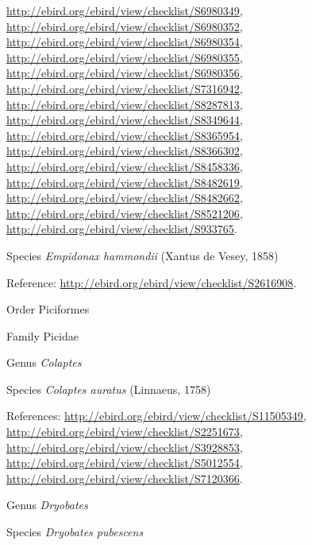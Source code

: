 \documentclass[9pt, article]{memoir}
\begin{document}
\begin{multicols}{2}
\url{http://ebird.org/ebird/view/checklist/S6980349}, 
\url{http://ebird.org/ebird/view/checklist/S6980352}, 
\url{http://ebird.org/ebird/view/checklist/S6980354}, 
\url{http://ebird.org/ebird/view/checklist/S6980355}, 
\url{http://ebird.org/ebird/view/checklist/S6980356}, 
\url{http://ebird.org/ebird/view/checklist/S7316942}, 
\url{http://ebird.org/ebird/view/checklist/S8287813}, 
\url{http://ebird.org/ebird/view/checklist/S8349644}, 
\url{http://ebird.org/ebird/view/checklist/S8365954}, 
\url{http://ebird.org/ebird/view/checklist/S8366302}, 
\url{http://ebird.org/ebird/view/checklist/S8458336}, 
\url{http://ebird.org/ebird/view/checklist/S8482619}, 
\url{http://ebird.org/ebird/view/checklist/S8482662}, 
\url{http://ebird.org/ebird/view/checklist/S8521206}, 
\url{http://ebird.org/ebird/view/checklist/S933765}.

\vspace{6pt}\noindent\hspace{36pt}Species \textit{Empidonax hammondii} (Xantus de Vesey, 1858)


\vspace{6pt}Reference: 
\url{http://ebird.org/ebird/view/checklist/S2616908}.

\vspace{6pt}\noindent\hspace{18pt}Order Piciformes


\vspace{6pt}\noindent\hspace{24pt}Family Picidae


\vspace{6pt}\noindent\hspace{30pt}Genus \textit{Colaptes}


\vspace{6pt}\noindent\hspace{36pt}Species \textit{Colaptes auratus} (Linnaeus, 1758)


\vspace{6pt}References: 
\url{http://ebird.org/ebird/view/checklist/S11505349}, 
\url{http://ebird.org/ebird/view/checklist/S2251673}, 
\url{http://ebird.org/ebird/view/checklist/S3928853}, 
\url{http://ebird.org/ebird/view/checklist/S5012554}, 
\url{http://ebird.org/ebird/view/checklist/S7120366}.

\vspace{6pt}\noindent\hspace{30pt}Genus \textit{Dryobates}


\vspace{6pt}\noindent\hspace{36pt}Species \textit{Dryobates pubescens}



\end{multicols}
\end{document}
